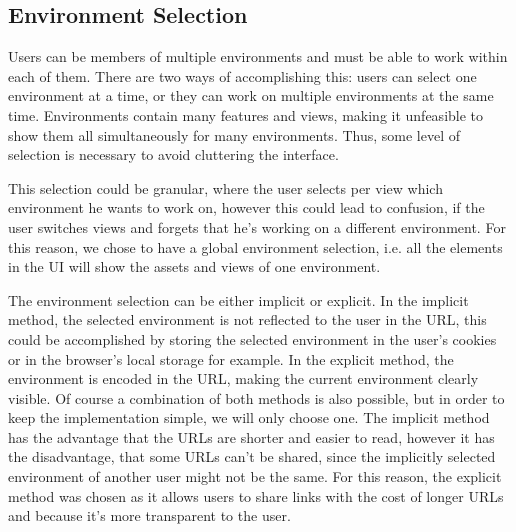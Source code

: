 



\subsection{Environment Selection}

Users can be members of multiple environments and must be able to work within each of them.
There are two ways of accomplishing this: users can select one environment at a time,
or they can work on multiple environments at the same time.
%
%
Environments contain many features and views, making it unfeasible to show them all
simultaneously for many environments.
Thus, some level of selection is necessary to avoid cluttering the interface.

%
This selection could be granular, where the user selects per view which environment he
wants to work on, however this could lead to confusion, if the user switches views and
forgets that he's working on a different environment.
For this reason, we chose to have a global environment selection, i.e. all the elements in
the UI will show the assets and views of one environment.

The environment selection can be either implicit or explicit.
In the implicit method, the selected environment is not
reflected to the user in the URL, this could be accomplished by storing the selected
environment in the user's cookies or in the browser's local storage for example.
In the explicit method, the environment is encoded in the URL,
making the current environment clearly visible.
Of course a combination of both methods is also possible, but in order to keep the
implementation simple, we will only choose one.
The implicit method has the advantage that the URLs are shorter and easier to read,
however it has the disadvantage, that some URLs can't be shared, since the implicitly
selected environment of another user might not be the same.
For this reason, the explicit method was chosen as it allows users to share links with the
cost of longer URLs and because it's more transparent to the user.

